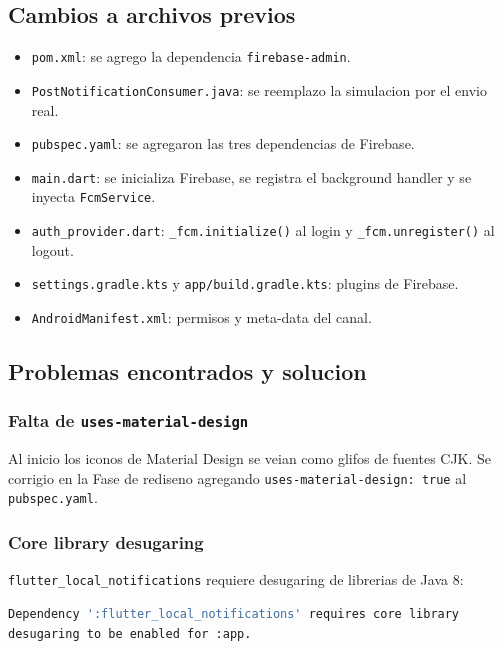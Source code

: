 \subsection{Cambios a archivos previos}

\begin{itemize}[leftmargin=*]
  \item \texttt{pom.xml}: se agrego la dependencia \texttt{firebase-admin}.
  \item \texttt{PostNotificationConsumer.java}: se reemplazo la simulacion por el envio real.
  \item \texttt{pubspec.yaml}: se agregaron las tres dependencias de Firebase.
  \item \texttt{main.dart}: se inicializa Firebase, se registra el background handler y se inyecta \texttt{FcmService}.
  \item \texttt{auth\_provider.dart}: \texttt{\_fcm.initialize()} al login y \texttt{\_fcm.unregister()} al logout.
  \item \texttt{settings.gradle.kts} y \texttt{app/build.gradle.kts}: plugins de Firebase.
  \item \texttt{AndroidManifest.xml}: permisos y meta-data del canal.
\end{itemize}

\subsection{Problemas encontrados y solucion}

\subsubsection{Falta de \texttt{uses-material-design}}

Al inicio los iconos de Material Design se veian como glifos de fuentes CJK. Se corrigio en la Fase de rediseno agregando \texttt{uses-material-design: true} al \texttt{pubspec.yaml}.

\subsubsection{Core library desugaring}

\texttt{flutter\_local\_notifications} requiere desugaring de librerias de Java 8:

\begin{lstlisting}[language=bash]
Dependency ':flutter_local_notifications' requires core library
desugaring to be enabled for :app.
\end{lstlisting}

